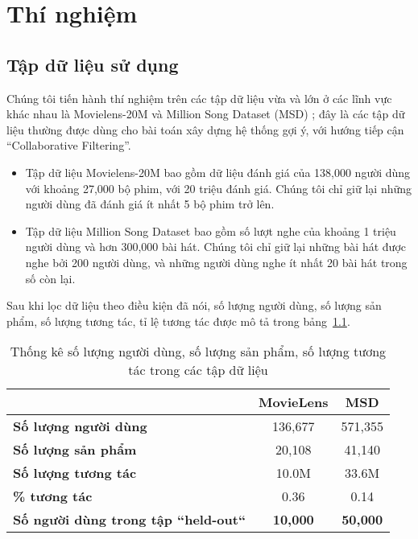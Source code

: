 \chapter{Thí nghiệm}
\label{Chapter4}

\section{Tập dữ liệu sử dụng}
Chúng tôi tiến hành thí nghiệm trên các tập dữ liệu vừa và lớn ở các lĩnh vực khác nhau là Movielens-20M \cite{Ml20M} 
và Million Song Dataset (MSD) \cite{MSD}; đây là các tập dữ liệu thường được dùng cho bài toán xây dựng hệ thống gợi ý,
với hướng tiếp cận ``Collaborative Filtering''.
\begin{itemize}
    \item Tập dữ liệu Movielens-20M bao gồm dữ liệu đánh giá của 138,000 người dùng với khoảng 27,000 bộ phim,
    với 20 triệu đánh giá. Chúng tôi chỉ giữ lại những người dùng đã đánh giá ít nhất 5 bộ phim trở lên. 
    \item Tập dữ liệu Million Song Dataset bao gồm số lượt nghe của khoảng 1 triệu người dùng và hơn 300,000 bài hát.
    Chúng tôi chỉ giữ lại những bài hát được nghe bởi 200 người dùng, và những người dùng nghe ít nhất 20 bài hát trong số còn lại.
\end{itemize}
Sau khi lọc dữ liệu theo điều kiện đã nói, số lượng người dùng, số lượng sản phẩm, số lượng tương tác, tỉ lệ tương tác được mô tả trong bảng~\ref{table_dataset}.
\begin{table}[]
\centering
    \begin{tabular}{|l|c|c|}
    \hline
                                                & \textbf{MovieLens} & \textbf{MSD}    \\ \hline
    \textbf{Số lượng người dùng}                  & 136,677            & 571,355         \\ \hline
    \textbf{Số lượng sản phẩm}                    & 20,108             & 41,140          \\ \hline
    \textbf{Số lượng tương tác}                   & 10.0M              & 33.6M           \\ \hline
    \textbf{\% tương tác}                         & 0.36               & 0.14            \\ \hline
    \textbf{Số người dùng trong tập ``held-out``} & \textbf{10,000}    & \textbf{50,000} \\ \hline
    \end{tabular}
    \label{table_dataset}
    \caption{Thống kê số lượng người dùng, số lượng sản phẩm, số lượng tương tác trong các tập dữ liệu}    
\end{table}


